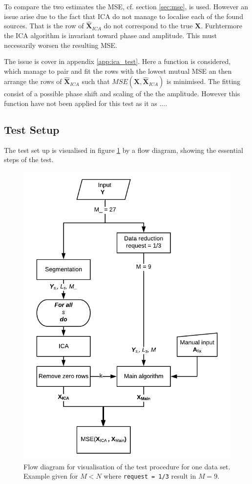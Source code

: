 To compare the two estimates the MSE, cf. section \ref{sec:mse}, is used. 
However an issue arise due to the fact that ICA do not manage to localise each of the found sources. That is the row of $\hat{\textbf{X}}_{ICA}$ do not correspond to the true $\textbf{X}$. Furhtermore the ICA algorithm is invariant toward phase and amplitude. This must necessarily worsen the resulting MSE.  

The issue is cover in appendix \ref{app:ica_test}. Here a function is considered, which manage to pair and fit the rows with the lowest mutual MSE an then arrange the rows of $\hat{\textbf{X}}_{ICA}$ such that $MSE(\textbf{X},\hat{\textbf{X}}_{ICA})$ is minimised. The fitting consist of a possible phase shift and scaling of the the amplitude.   
However this function have not been applied for this test as it as .... 

\subsection{Test Setup}
The test set up is visualised in figure \ref{fig:flow2} by a flow diagram, showing the essential steps of the test. 

\begin{figure}[H]
    \centering
	\includegraphics[scale=0.8]{figures/ch_7/flow2.png}
	\caption{Flow diagram for visualisation of the test procedure for one data set. Example given for $M<N$ where \texttt{request = 1/3} result in $M=9$.}
	\label{fig:flow2}
\end{figure}

